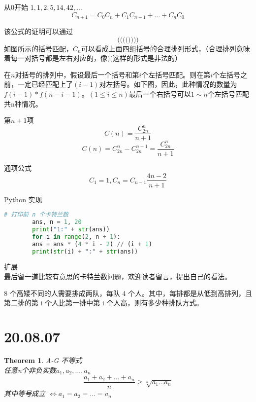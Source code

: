 \documentclass[10pt,a4paper]{book}
\newtheorem{theorem}{Theorem}[section]
\begin{document}
	从0开始 $ 1, 1, 2, 5, 14, 42, \dots $
	\[
	C_{n+1} = C_0 C_n + C_1 C_{n-1} + \dots + C_n C_0
	\]
	
	该公式的证明可以通过
	\[
	\Bigg( \bigg( \Big( \big( \Bigg) \bigg) \Big) \big)
	\]
	如图所示的括号匹配，$ C_n $可以看成上面四组括号的合理排列形式，（合理排列意味着每一对括号都是左右对应的，像$ )( $这样的形式是非法的）
	
	在$ n $对括号的排列中，假设最后一个括号和第$ i $个左括号匹配。则在第$ i $个左括号之前，一定已经匹配上了$ (i-1) $对左括号。如下图，因此，此种情况的数量为$ f(i-1)*f(n-i-1) $。$ (1\leq i\leq n) $最后一个右括号可以$ 1 \sim n $个左括号匹配共n种情况。
	
	
	
	第$ n+1 $项 
	\[C(n) = \frac{C^n_{2n}}{n+1} \]
	\[	C(n) = C_{2n}^n-C_{2n}^{n-1} = \frac{C_{2n}^n}{n+1}	\]
	
	通项公式
	\[ C_1 = 1, C_n = C_{n-1}\frac{4n-2}{n+1} \]
	
	
	Python 实现
	
	
	\begin{lstlisting}[language=Python]
		# 打印前 n 个卡特兰数
		ans, n = 1, 20
		print("1:" + str(ans))
		for i in range(2, n + 1):
		ans = ans * (4 * i - 2) // (i + 1)
		print(str(i) + ":" + str(ans))
	\end{lstlisting}
	
	
	扩展\\
	
	最后留一道比较有意思的卡特兰数问题，欢迎读者留言，提出自己的看法。
	
	8 个高矮不同的人需要排成两队，每队 4 个人。其中，每排都是从低到高排列，且第二排的第 i 个人比第一排中第 i 个人高，则有多少种排队方式。
	
	
	
	\section{20.08.07}
	
	\begin{theorem}
	A-G 不等式\\ 任意n个非负实数$ a_1, a_2, \dots, a_n$ \\
	\begin{equation}
		\frac{a_1 + a_2 + \dots + a_n}{n} \geq \sqrt[n]{a_1\dots a_n}
	\end{equation}
	其中等号成立 $\iff a_1 = a_2 = \dots = a_n$

	\label{thm-1}
	\end{theorem}
\end{document}
